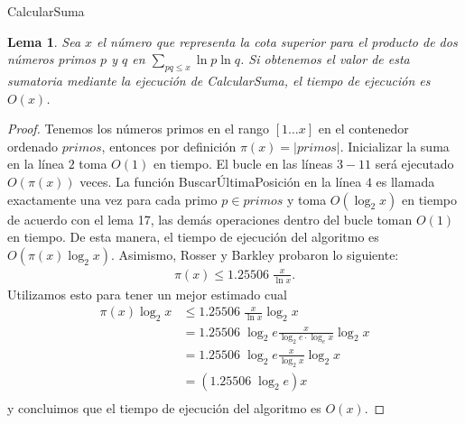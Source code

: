 \documentclass[10pt]{article}
\newtheorem{lemma}[theorem]{Lema}
\theoremstyle{definition}
\theoremstyle{remark}
\begin{document}
\begin{algorithm}[H]
\SetAlgoLined
\DontPrintSemicolon
{}
\caption{CalcularSuma\label{CS}}
\end{algorithm}

\begin{lemma}
Sea $x$ el n\'umero que representa la cota superior para el producto de dos n\'umeros primos
$p$ y $q$ en $\sum_{pq \leq x} \ln p \ln q$.
Si obtenemos el valor de esta sumatoria mediante la ejecuci\'on de CalcularSuma, 
el tiempo de ejecuci\'on es $O(x)$.
\end{lemma}

\begin{proof}
Tenemos los n\'umeros primos en el rango $[1 \dots x]$ en el contenedor ordenado $primos$,
entonces por definici\'on $\pi(x)=|primos| $.
Inicializar la suma en la l\'inea $2$ toma $O(1)$ en tiempo.
El bucle en las l\'ineas $3-11$ ser\'a ejecutado $O(\pi(x))$ veces.
La funci\'on Buscar\'UltimaPosici\'on en la l\'inea $4$ es llamada exactamente una vez para cada primo $p \in primos$ y
toma $O(\log_2 x)$ en tiempo de acuerdo con el lema 17, 
las dem\'as operaciones dentro del bucle toman $O(1)$ en tiempo.
De esta manera, el tiempo de ejecuci\'on del algoritmo es $O(\pi(x)\log_2 x)$.
Asimismo, Rosser y Barkley \cite[teorema 2 y corolario 1]{Chebyshev} probaron lo siguiente:
\begin{align}
\pi(x) \leq 1.25506\;\frac{x}{\ln x}. %
\end{align}
Utilizamos esto para tener un mejor estimado cual 
\begin{align}
    \pi(x)\log_2 x &\leq 1.25506\;\frac{x}{\ln x} \log_2 x\\
    &= 1.25506\;\log_2 e \frac{x}{\log_2 e \cdot \log_e x} \log_2 x\\
    &= 1.25506\;\log_2 e \frac{x}{\log_2 x} \log_2 x\\
    &= (1.25506\;\log_2 e) x\\
\end{align}
y concluimos que el tiempo de ejecuci\'on del algoritmo es $O(x)$.
\end{proof}
\end{document}
